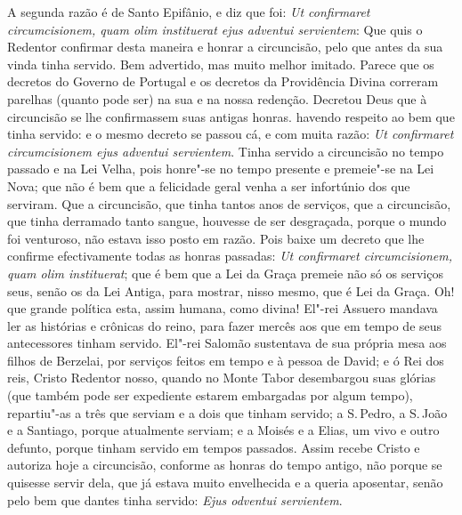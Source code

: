 A segunda razão é de Santo Epifânio, e diz que foi: \emph{Ut confirmaret
circumcisionem, quam olim instituerat ejus adventui servientem}: Que
quis o Redentor confirmar desta maneira e honrar a circuncisão, pelo que
antes da sua vinda tinha servido. Bem advertido, mas muito melhor
imitado. Parece que os decretos do Governo de Portugal e os decretos da
Providência Divina correram parelhas (quanto pode ser) na sua e na nossa
redenção. Decretou Deus que à circuncisão se lhe confirmassem suas
antigas honras. havendo respeito ao bem que tinha servido: e o mesmo
decreto se passou cá, e com muita razão: \emph{Ut confirmaret
circumcisionem ejus adventui servientem}. Tinha servido a circuncisão no
tempo passado e na Lei Velha, pois honre"-se no tempo presente e
premeie"-se na Lei Nova; que não é bem que a felicidade geral venha a
ser infortúnio dos que serviram. Que a circuncisão, que tinha tantos
anos de serviços, que a circuncisão, que tinha derramado tanto sangue,
houvesse de ser desgraçada, porque o mundo foi venturoso, não estava
isso posto em razão. Pois baixe um decreto que lhe confirme
efectivamente todas as honras passadas: \emph{Ut confirmaret
circumcisionem, quam olim instituerat}; que é bem que a Lei da Graça
premeie não só os serviços seus, senão os da Lei Antiga, para mostrar,
nisso mesmo, que é Lei da Graça.
Oh! que grande política esta, assim humana, como divina! El"-rei Assuero
mandava ler as histórias e crônicas do reino, para fazer mercês aos que
em tempo de seus antecessores tinham servido. El"-rei Salomão sustentava
de sua própria mesa aos filhos de Berzelai, por serviços feitos em tempo
e à pessoa de David; e ó Rei dos reis, Cristo Redentor nosso, quando no
Monte Tabor desembargou suas glórias (que também pode ser expediente
estarem embargadas por algum tempo), repartiu"-as a três que serviam e a
dois que tinham servido; a S.\,Pedro, a S.\,João e a Santiago, porque
atualmente serviam; e a Moisés e a Elias, um vivo e outro defunto,
porque tinham servido em tempos passados. Assim recebe Cristo e autoriza
hoje a circuncisão, conforme as honras do tempo antigo, não porque se
quisesse servir dela, que já estava muito envelhecida e a queria
aposentar, senão pelo bem que dantes tinha servido: \emph{Ejus odventui
servientem}.

